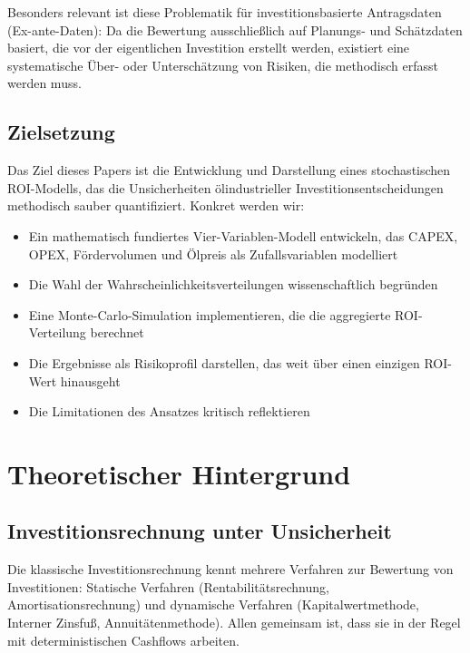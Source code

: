 \documentclass[12pt,a4paper]{article}
\begin{document}
Besonders relevant ist diese Problematik für investitionsbasierte Antragsdaten (Ex-ante-Daten): Da die Bewertung ausschließlich auf Planungs- und Schätzdaten basiert, die vor der eigentlichen Investition erstellt werden, existiert eine systematische Über- oder Unterschätzung von Risiken, die methodisch erfasst werden muss.

\subsection{Zielsetzung}

Das Ziel dieses Papers ist die Entwicklung und Darstellung eines stochastischen ROI-Modells, das die Unsicherheiten ölindustrieller Investitionsentscheidungen methodisch sauber quantifiziert. Konkret werden wir:

\begin{itemize}[itemsep=2pt]
  \item Ein mathematisch fundiertes Vier-Variablen-Modell entwickeln, das CAPEX, OPEX, Fördervolumen und Ölpreis als Zufallsvariablen modelliert
  \item Die Wahl der Wahrscheinlichkeitsverteilungen wissenschaftlich begründen
  \item Eine Monte-Carlo-Simulation implementieren, die die aggregierte ROI-Verteilung berechnet
  \item Die Ergebnisse als Risikoprofil darstellen, das weit über einen einzigen ROI-Wert hinausgeht
  \item Die Limitationen des Ansatzes kritisch reflektieren
\end{itemize}

\section{Theoretischer Hintergrund}

\subsection{Investitionsrechnung unter Unsicherheit}

Die klassische Investitionsrechnung kennt mehrere Verfahren zur Bewertung von Investitionen: Statische Verfahren (Rentabilitätsrechnung, Amortisationsrechnung) und dynamische Verfahren (Kapitalwertmethode, Interner Zinsfuß, Annuitätenmethode). Allen gemeinsam ist, dass sie in der Regel mit deterministischen Cashflows arbeiten.
\end{document}
